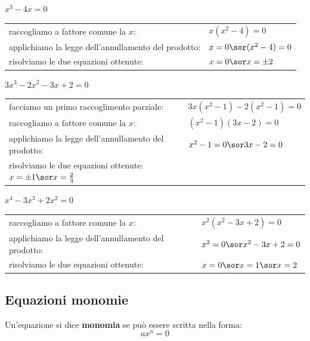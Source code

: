 \begin{esempio}
\(x^3-4x=0\)
\begin{center}
\begin{tabular}{ll}
raccogliamo a fattore comune la \(x\): & \(x(x^2-4)=0\)\\
applichiamo la legge dell'annullamento del prodotto: & \(x=0 \sor (x^2-4)=0\)\\
risolviamo le due equazioni ottenute: & \(x=0 \sor x=\pm 2\)
\end{tabular}
\end{center}
\end{esempio}

\begin{esempio}
\(3x^3-2x^2-3x+2=0\)
\begin{center}
\begin{tabular}{ll}
facciamo un primo raccoglimento parziale: & \(3x(x^2-1)-2(x^2-1)=0\)\\
raccogliamo a fattore comune la \(x\): & \((x^2-1)(3x-2)=0\)\\
applichiamo la legge dell'annullamento del prodotto: & \(x^2-1=0 \sor 3x-2=0\)\\
risolviamo le due equazioni ottenute: \(x=\pm 1\sor x=\frac{2}{3}\)& 
\end{tabular}
\end{center}
\end{esempio}

\begin{esempio}
\(x^4-3x^3+2x^2=0\)
\begin{center}
\begin{tabular}{ll}
raccogliamo a fattore comune la \(x\): & \(x^2(x^2-3x+2)=0\)\\
applichiamo la legge dell'annullamento del prodotto: & \(x^2=0 \sor x^2-3x+2=0\)\\
risolviamo le due equazioni ottenute: & \(x=0 \sor x=1 \sor x=2\)
\end{tabular}
\end{center}
\end{esempio}

\subsection{Equazioni monomie}

\begin{definizione}
Un'equazione si dice \textbf{monomia} se può essere scritta nella forma:
\[ax^n=0\]      
\end{definizione}

